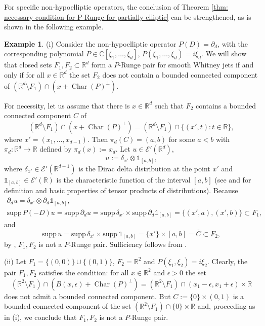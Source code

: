 \documentclass[a4paper,10pt]{amsart}
\newtheorem*{crucial lemma}{Lemma \ref{lem:nice polynomial2}}
\theoremstyle{definition}
\newtheorem{example}[theorem]{Example}
\newcommand{\R}{\mathbb{R}}
\newcommand{\C}{\mathbb{C}}
\newcommand{\supp}{\mbox{supp}\,}
\newcommand{\charcone}{\operatorname{Char}}
\begin{document}
For specific non-hypoelliptic operators, the conclusion of Theorem \ref{thm: necessary condition for P-Runge for partially elliptic} can be strengthened, as is shown in the following example.  
\begin{example}\label{example:P-Runge non-hypoelliptic}
(i) Consider the non-hypoelliptic operator $P(D)=\partial_d$, with the corresponding polynomial $P\in\C[\xi_1,\ldots,\xi_d]$, $P(\xi_1,\ldots,\xi_d)=i\xi_d$. We will show that closed sets $F_1, F_2\subset \R^d$ form a $P$-Runge pair for smooth Whitney jets if and only if for all $x\in\R^d$ the set $F_2$ does not contain a bounded connected component of $(\R^d\setminus F_1)\cap (x+\charcone(P)^\perp)$. 

For necessity, let us assume that there is $x\in\R^d$ such that $F_2$ contains a bounded connected component $C$ of 
\[(\R^d\setminus F_1)\cap (x+\charcone(P)^\perp)=(\R^d\setminus F_1)\cap\{(x',t)\colon t\in\R\},\]
where $x'=(x_1,\ldots,x_{d-1})$.
Then $\pi_d(C)=(a,b)$ for some $a<b$ with $\pi_d\colon\R^d\to\R$ defined by $\pi_d(x):=x_d$.
Let $u\in\mathscr{E}'(\R^d)$, 
\[u:=\delta_{x'}\otimes\mathds{1} _{[a,b]},\]
where
$\delta_{x'}\in\mathscr{E'}(\R^{d-1})$ is the Dirac delta distribution at the point $x'$ and $\mathds{1} _{[a,b]}\in\mathscr{E}'(\R)$ is the characteristic function of the interval $[a,b]$ (see \cite[Section 5.1]{Hor1} and \cite[Section 1.5]{OrtnerWagner2015} for definition and basic properties of tensor products of distributions). 
Because
\begin{equation*}
\begin{gathered}
    \partial_du=\delta_{x'}\otimes\partial_d\mathds{1} _{[a,b]},\\
    \supp P(-D)u=\supp\partial_du=\supp\delta_{x'}\times\supp\partial_d\mathds{1} _{[a,b]}=\{(x',a),(x',b)\}\subset F_1,
\end{gathered}
\end{equation*}
and
\[\supp u=\supp \delta_{x'}\times \supp \mathds{1}_{[a,b]}=\{x'\}\times[a,b]= \overline C\subset F_2,\]
by \cite[Theorem 5]{CiasKalmes2025}, $F_1, F_2$ is not a $P$-Runge pair. Sufficiency follows from \cite[Theorem 16]{CiasKalmes2025}.

(ii) Let $F_1=\{(0,0)\}\cup\{(0,1)\}$, $F_2=\R^2$ and $P(\xi_1,\xi_2)=i\xi_2$. Clearly, the pair $F_1,F_2$ satisfies the condition: for all $x\in\R^2$ and $\epsilon>0$ the set
\[(\R^2\setminus F_1)\cap (B(x,\epsilon)+\charcone(P)^\perp)
=(\R^2\setminus F_1)\cap (x_1-\epsilon,x_1+\epsilon)\times\R\]
does not admit a bounded connected component. But $C:=\{0\}\times(0,1)$ is a bounded connected component of the set $(\R^2\setminus F_1)\cap \{0\}\times\R$ and, proceeding as in (i), we conclude that $F_1,F_2$ is not a $P$-Runge pair. 
\end{example}
\end{document}
